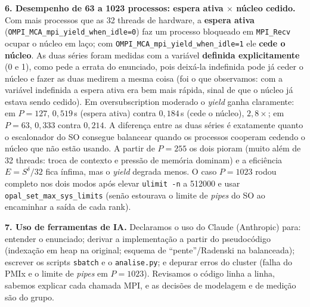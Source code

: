 \documentclass[10pt]{article}
\newcommand{\sd}{\ensuremath{S^{\delta}}}
\begin{document}
\textbf{6. Desempenho de 63 a 1023 processos: espera ativa $\times$ núcleo cedido.}
Com mais processos que as 32 threads de hardware, a \textbf{espera ativa}
(\texttt{OMPI\_MCA\_mpi\_yield\_when\_idle=0}) faz um processo bloqueado em \texttt{MPI\_Recv} ocupar o
núcleo em laço; com \texttt{OMPI\_MCA\_mpi\_yield\_when\_idle=1} ele \textbf{cede o núcleo}. As duas
séries foram medidas com a variável \textbf{definida explicitamente} (0 e 1), como pede a errata do
enunciado, pois deixá-la indefinida pode já ceder o núcleo e fazer as duas medirem a mesma coisa (foi o
que observamos: com a variável indefinida a espera ativa era bem mais rápida, sinal de que o núcleo já
estava sendo cedido). Em oversubscription moderado o \emph{yield} ganha claramente: em $P{=}127$,
$0{,}519$\,s (espera ativa) contra $0{,}184$\,s (cede o núcleo), $2{,}8\times$; em $P{=}63$, $0{,}333$
contra $0{,}214$. A diferença entre as duas séries é exatamente quanto o
escalonador do SO consegue balancear quando os processos cooperam cedendo o núcleo que não estão usando.
A partir de $P{=}255$ os dois pioram (muito além de 32 threads: troca de contexto e pressão de memória
dominam) e a eficiência $E=\sd/32$ fica ínfima, mas o \emph{yield} degrada menos. O caso $P{=}1023$ rodou
completo nos dois modos após elevar \texttt{ulimit -n} a 512000 e usar \texttt{opal\_set\_max\_sys\_limits}
(senão estourava o limite de \emph{pipes} do SO ao encaminhar a saída de cada rank).

\textbf{7. Uso de ferramentas de IA.}
Declaramos o uso do Claude (Anthropic) para: entender o enunciado; derivar a implementação a partir do
pseudocódigo (indexação em heap na original; esquema de ``pente''/Radenski na balanceada); escrever os
scripts \texttt{sbatch} e o \texttt{analise.py}; e depurar erros do cluster (falha do PMIx e o limite de
\emph{pipes} em $P{=}1023$). Revisamos o código linha a linha, sabemos explicar cada chamada MPI, e as
decisões de modelagem e de medição são do grupo.
\end{document}
